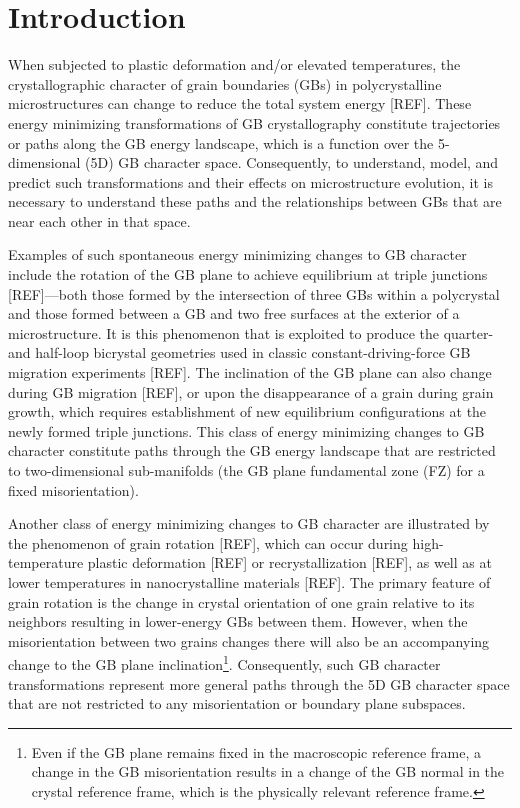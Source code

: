 \documentclass[final,twocolumn,12pt]{elsarticle}
\begin{document}
	
	\section{Introduction} \label{sec:intro}
	
	When subjected to plastic deformation and/or elevated temperatures, the crystallographic character of grain boundaries (GBs) in polycrystalline microstructures can change to reduce the total system energy [REF]. These energy minimizing transformations of GB crystallography constitute trajectories or paths along the GB energy landscape, which is a function over the 5-dimensional (5D) GB character space. Consequently, to understand, model, and predict such transformations and their effects on microstructure evolution, it is necessary to understand these paths and the relationships between GBs that are near each other in that space.
	
	Examples of such spontaneous energy minimizing changes to GB character include the rotation of the GB plane to achieve equilibrium at triple junctions [REF]---both those formed by the intersection of three GBs within a polycrystal and those formed between a GB and two free surfaces at the exterior of a microstructure. It is this phenomenon that is exploited to produce the quarter- and half-loop bicrystal geometries used in classic constant-driving-force GB migration experiments [REF]. The inclination of the GB plane can also change during GB migration [REF], or upon the disappearance of a grain during grain growth, which requires establishment of new equilibrium configurations at the newly formed triple junctions. This class of energy minimizing changes to GB character constitute paths through the GB energy landscape that are restricted to two-dimensional sub-manifolds (the GB plane fundamental zone (FZ) for a fixed misorientation).
	
	Another class of energy minimizing changes to GB character are illustrated by the phenomenon of grain rotation [REF], which can occur during high-temperature plastic deformation [REF] or recrystallization [REF], as well as at lower temperatures in nanocrystalline materials [REF]. The primary feature of grain rotation is the change in crystal orientation of one grain relative to its neighbors resulting in lower-energy GBs between them. However, when the misorientation between two grains changes there will also be an accompanying change to the GB plane inclination\footnote{Even if the GB plane remains fixed in the macroscopic reference frame, a change in the GB misorientation results in a change of the GB normal in the crystal reference frame, which is the physically relevant reference frame.}. Consequently, such GB character transformations represent more general paths through the 5D GB character space that are not restricted to any misorientation or boundary plane subspaces.
	
\end{document}
